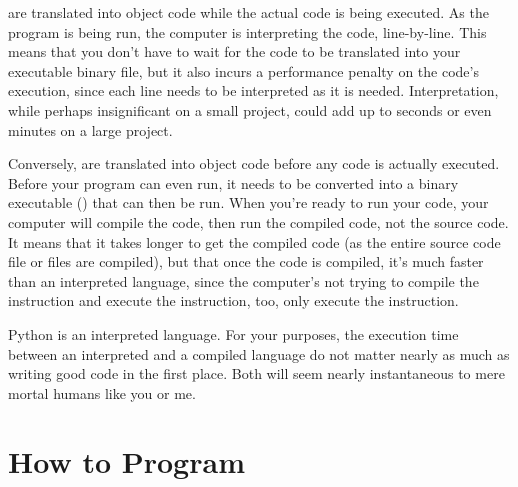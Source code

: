  are translated into object code while the actual code is being executed. As the program is being run, the computer is interpreting the code, line-by-line. This means that you don't have to wait for the code to be translated into your executable binary file, but it also incurs a performance penalty on the code's execution, since each line needs to be interpreted as it is needed. Interpretation, while perhaps insignificant on a small project, could add up to seconds or even minutes on a large project.\par
Conversely,  are translated into object code before any code is actually executed. Before your program can even run, it needs to be converted into a binary executable () that can then be run. When you're ready to run your code, your computer will compile the code, then run the compiled code, not the source code. It means that it takes longer to get the compiled code (as the entire source code file or files are compiled), but that once the code is compiled, it's much faster than an interpreted language, since the computer's not trying to compile the instruction and execute the instruction, too, only execute the instruction. \par
Python is an interpreted language. For your purposes, the execution time between an interpreted and a compiled language do not matter nearly as much as writing good code in the first place. Both will seem nearly instantaneous to mere mortal humans like you or me.\par

\section{How to Program}
